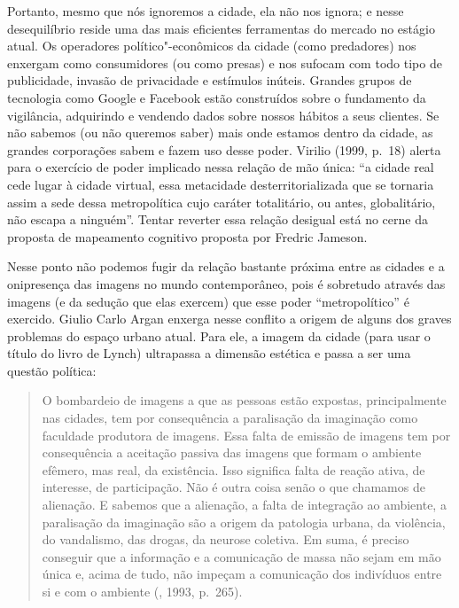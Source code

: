 Portanto, mesmo que nós ignoremos a cidade, ela não nos ignora; e nesse
desequilíbrio reside uma das mais eficientes ferramentas do mercado no
estágio atual. Os operadores político"-econômicos da cidade (como
predadores) nos enxergam como consumidores (ou como presas) e nos
sufocam com todo tipo de publicidade, invasão de privacidade e estímulos
inúteis. Grandes grupos de tecnologia como Google e Facebook estão
construídos sobre o fundamento da vigilância, adquirindo e vendendo
dados sobre nossos hábitos a seus clientes. Se não sabemos (ou não
queremos saber) mais onde estamos dentro da cidade, as grandes
corporações sabem e fazem uso desse poder. Virilio (1999, p.~18) alerta
para o exercício de poder implicado nessa relação de mão única: ``a
cidade real cede lugar à cidade virtual, essa metacidade
desterritorializada que se tornaria assim a sede dessa metropolítica
cujo caráter totalitário, ou antes, globalitário, não escapa a
ninguém''. Tentar reverter essa relação desigual está no cerne da
proposta de mapeamento cognitivo proposta por Fredric Jameson.

Nesse ponto não podemos fugir da relação bastante próxima entre as
cidades e a onipresença das imagens no mundo contemporâneo, pois é
sobretudo através das imagens (e da sedução que elas exercem) que esse
poder ``metropolítico'' é exercido. Giulio Carlo Argan enxerga nesse
conflito a origem de alguns dos graves problemas do espaço urbano atual.
Para ele, a imagem da cidade (para usar o título do livro de Lynch)
ultrapassa a dimensão estética e passa a ser uma questão política:

\begin{quote}
O bombardeio de imagens a que as pessoas estão expostas, principalmente
nas cidades, tem por consequência a paralisação da imaginação como
faculdade produtora de imagens. Essa falta de emissão de imagens tem por
consequência a aceitação passiva das imagens que formam o ambiente
efêmero, mas real, da existência. Isso significa falta de reação ativa,
de interesse, de participação. Não é outra coisa senão o que chamamos de
alienação. E sabemos que a alienação, a falta de integração ao ambiente,
a paralisação da imaginação são a origem da patologia urbana, da
violência, do vandalismo, das drogas, da neurose coletiva. Em suma, é
preciso conseguir que a informação e a comunicação de massa não sejam em
mão única e, acima de tudo, não impeçam a comunicação dos indivíduos
entre si e com o ambiente (, 1993, p.~265).
\end{quote}


